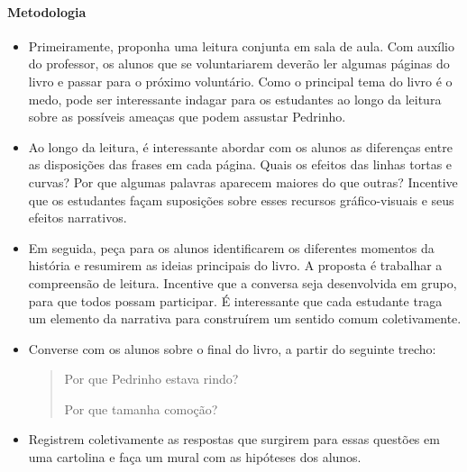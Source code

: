 \documentclass[11pt]{extarticle}
\begin{document}
\pagebreak
\paragraph{Metodologia} 

\begin{itemize}

\item Primeiramente, proponha uma leitura conjunta em sala de aula. Com auxílio do professor, os alunos que se voluntariarem deverão ler algumas páginas do livro e passar para o próximo voluntário. Como o principal tema do livro é o medo, pode ser interessante indagar para os estudantes ao longo da leitura sobre as possíveis ameaças que podem assustar Pedrinho.

\item Ao longo da leitura, é interessante abordar com os alunos as diferenças entre as disposições das frases em cada página. Quais os efeitos das linhas tortas e curvas? Por que algumas palavras aparecem maiores do que outras? Incentive que os estudantes façam suposições sobre esses recursos gráfico-visuais e seus efeitos narrativos.


\item Em seguida, peça para os alunos identificarem os diferentes momentos da história e resumirem as ideias principais do livro. A proposta é trabalhar a compreensão de leitura. Incentive que a conversa seja desenvolvida em grupo, para que todos possam participar. É interessante que cada estudante traga um elemento da narrativa para construírem um sentido comum coletivamente.

\item Converse com os alunos sobre o final do livro, a partir do seguinte trecho:

\begin{quote} {Por que Pedrinho estava rindo? 

Por que tamanha comoção?}
\end{quote}

\item Registrem coletivamente as respostas que surgirem para essas questões em uma cartolina e faça um mural com as hipóteses dos alunos.

\end{itemize}


\end{document}
